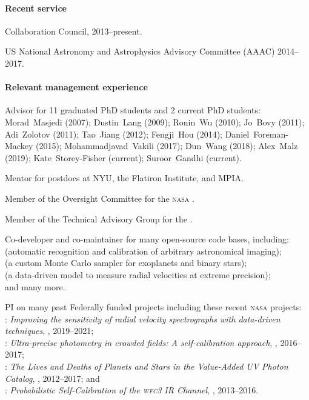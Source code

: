 \documentclass[12pt]{article}
\begin{document}
\paragraph{Recent service}
\begin{list}{}{\hogglist}
\item
{} Collaboration Council,
2013--present.
\item
US National Astronomy and Astrophysics Advisory Committee (AAAC)
2014--2017.
\end{list}

\paragraph{Relevant management experience}
\begin{list}{}{\hogglist}
\item
Advisor for 11 graduated PhD students and 2 current PhD students:
Morad~Masjedi (2007);
Dustin~Lang (2009);
Ronin~Wu (2010);
Jo~Bovy (2011);
Adi~Zolotov (2011);
Tao~Jiang (2012);
Fengji~Hou (2014);
Daniel~Foreman-Mackey (2015);
Mohammadjavad~Vakili (2017);
Dun~Wang (2018);
Alex~Malz (2019);
Kate~Storey-Fisher (current);
Suroor~Gandhi (current).
\item
Mentor for postdocs at NYU, the Flatiron Institute, and MPIA.
\item
Member of the Oversight Committee for the \textsc{nasa} .
\item
Member of the Technical Advisory Group for the .
\item
Co-developer and co-maintainer for many open-source code bases,
including:\\
 (automatic recognition and calibration of arbitrary astronomical imaging);\\
 (a custom Monte Carlo sampler for exoplanets and binary stars);\\
 (a data-driven model to measure radial velocities at extreme precision);\\
and many more.
\item
PI on many past Federally funded projects including these recent
\textsc{nasa} projects:\\
: 
\textit{Improving the sensitivity of radial velocity spectrographs with
data-driven techniques},
, 2019--2021;\\
:
\textit{Ultra-precise photometry in crowded fields: A self-calibration approach},
, 2016--2017;\\
:
\textit{The Lives and Deaths of Planets and Stars in the Value-Added UV Photon Catalog},
, 2012--2017; and\\
:
\textit{Probabilistic Self-Calibration of the \textsc{wfc3} IR Channel},
, 2013--2016.
\end{list}
\end{document}
